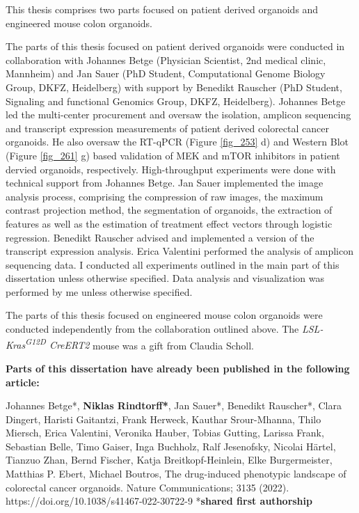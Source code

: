 \begin{flushleft}
This thesis comprises two parts focused on patient derived organoids and engineered mouse colon organoids. 
\bigbreak

The parts of this thesis focused on patient derived organoids were conducted in collaboration with Johannes Betge (Physician Scientist, 2nd medical clinic, Mannheim) and Jan Sauer (PhD Student, Computational Genome Biology Group, DKFZ, Heidelberg) with support by Benedikt Rauscher (PhD Student, Signaling and functional Genomics Group, DKFZ, Heidelberg). 
\smallbreak
Johannes Betge led the multi-center procurement and oversaw the isolation, amplicon sequencing and transcript expression measurements of patient derived colorectal cancer organoids. He also oversaw the RT-qPCR (Figure \ref{fig_253} d) and Western Blot (Figure \ref{fig_261} g) based validation of MEK and mTOR inhibitors in patient dervied organoids, respectively. High-throughput experiments were done with technical support from Johannes Betge. 
\smallbreak
Jan Sauer implemented the image analysis process, comprising the compression of raw images, the maximum contrast projection method, the segmentation of organoids, the extraction of features as well as the estimation of treatment effect vectors through logistic regression. 
\smallbreak
Benedikt Rauscher advised and implemented a version of the transcript expression analysis. 
\smallbreak
Erica Valentini performed the analysis of amplicon sequencing data.
\smallbreak
I conducted all experiments outlined in the main part of this dissertation unless otherwise specified. Data analysis and visualization was performed by me unless otherwise specified. 
\bigbreak

The parts of this thesis focused on engineered mouse colon organoids were conducted independently from the collaboration outlined above. The \textit{LSL-Kras\textsuperscript{G12D} CreERT2} mouse was a gift from Claudia Scholl.
\bigbreak

\textbf{Parts of this dissertation have already been published in the following article:}
\bigbreak

Johannes Betge*, \textbf{Niklas Rindtorff*}, Jan Sauer*, Benedikt Rauscher*, Clara Dingert, Haristi Gaitantzi, Frank Herweck, Kauthar Srour-Mhanna, Thilo Miersch, Erica Valentini, Veronika Hauber, Tobias Gutting, Larissa Frank, Sebastian Belle, Timo Gaiser, Inga Buchholz, Ralf Jesenofsky, Nicolai Härtel, Tianzuo Zhan, Bernd Fischer, Katja Breitkopf-Heinlein, Elke Burgermeister, Matthias P. Ebert, Michael Boutros, The drug-induced phenotypic landscape of colorectal cancer organoids. Nature Communications; 3135 (2022). https://doi.org/10.1038/s41467-022-30722-9 *\textbf{shared first authorship}


\end{flushleft}
